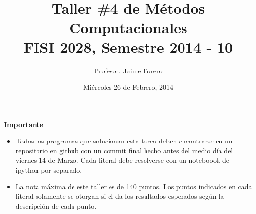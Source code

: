 \documentclass{article}
\title{Taller \#4 de M\'etodos Computacionales\\ FISI 2028, Semestre 2014 - 10}
\author{Profesor: Jaime Forero}
\date{Mi\'ercoles 26 de Febrero, 2014}
\begin{document}
\maketitle
\thispagestyle{empty}


{\bf Importante}
\begin{itemize}

\item Todos los programas que solucionan esta tarea deben encontrarse
  en un repositorio en github con un commit final hecho antes del
  medio d\'ia del viernes 14 de Marzo. Cada literal debe resolverse
  con un noteboook de ipython por separado.

\item La nota m\'axima de este taller es de 140 puntos. Los puntos indicados
  en cada literal solamente se otorgan si el da los resultados
  esperados seg\'un la descripci\'on de cada punto. 
 
\end{itemize}
\end{document}
